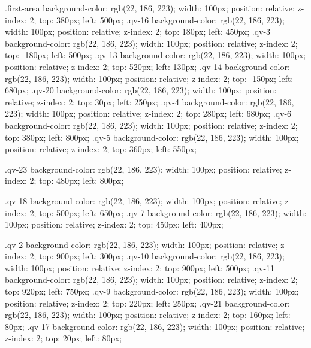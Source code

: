 .first-area{
    background-color: rgb(22, 186, 223);
    width: 100px;
    position: relative;
    z-index: 2;
    top: 380px;
    left: 500px;
}
.qv-16{
    background-color: rgb(22, 186, 223);
    width: 100px;
    position: relative;
    z-index: 2;
    top: 180px;
    left: 450px;
}
.qv-3{
    background-color: rgb(22, 186, 223);
    width: 100px;
    position: relative;
    z-index: 2;
    top: -180px;
    left: 500px;
}
.qv-13{
    background-color: rgb(22, 186, 223);
    width: 100px;
    position: relative;
    z-index: 2;
    top: 520px;
    left: 130px;
}
.qv-14{
    background-color: rgb(22, 186, 223);
    width: 100px;
    position: relative;
    z-index: 2;
    top: -150px;
    left: 680px;
}
.qv-20{
    background-color: rgb(22, 186, 223);
    width: 100px;
    position: relative;
    z-index: 2;
    top: 30px;
    left: 250px;
}
.qv-4{
    background-color: rgb(22, 186, 223);
    width: 100px;
    position: relative;
    z-index: 2;
    top: 280px;
    left: 680px;
}
.qv-6{
    background-color: rgb(22, 186, 223);
    width: 100px;
    position: relative;
    z-index: 2;
    top: 380px;
    left: 800px;
}
.qv-5{
    background-color: rgb(22, 186, 223);
    width: 100px;
    position: relative;
    z-index: 2;
    top: 360px;
    left: 550px;
}

.qv-23{
    background-color: rgb(22, 186, 223);
    width: 100px;
    position: relative;
    z-index: 2;
    top: 480px;
    left: 800px;
}

.qv-18{
    background-color: rgb(22, 186, 223);
    width: 100px;
    position: relative;
    z-index: 2;
    top: 500px;
    left: 650px;
}
.qv-7{
    background-color: rgb(22, 186, 223);
    width: 100px;
    position: relative;
    z-index: 2;
    top: 450px;
    left: 400px;
}

.qv-2{
    background-color: rgb(22, 186, 223);
    width: 100px;
    position: relative;
    z-index: 2;
    top: 900px;
    left: 300px;
}
.qv-10{
    background-color: rgb(22, 186, 223);
    width: 100px;
    position: relative;
    z-index: 2;
    top: 900px;
    left: 500px;
}
.qv-11{
    background-color: rgb(22, 186, 223);
    width: 100px;
    position: relative;
    z-index: 2;
    top: 920px;
    left: 750px;
}
.qv-9{
    background-color: rgb(22, 186, 223);
    width: 100px;
    position: relative;
    z-index: 2;
    top: 220px;
    left: 250px;
}
.qv-21{
    background-color: rgb(22, 186, 223);
    width: 100px;
    position: relative;
    z-index: 2;
    top: 160px;
    left: 80px;
}
.qv-17{
    background-color: rgb(22, 186, 223);
    width: 100px;
    position: relative;
    z-index: 2;
    top: 20px;
    left: 80px;
}


